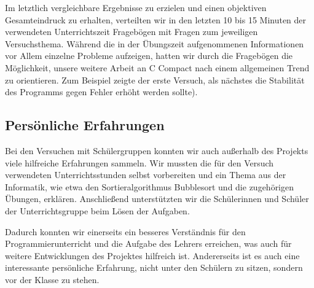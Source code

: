Im letztlich vergleichbare Ergebnisse zu erzielen und einen objektiven Gesamteindruck zu erhalten, verteilten wir in den letzten 10 bis 15 Minuten der verwendeten Unterrichtszeit Fragebögen mit Fragen zum jeweiligen Versuchsthema. Während die in der Übungszeit aufgenommenen Informationen vor Allem einzelne Probleme aufzeigen, hatten wir durch die Fragebögen die Möglichkeit, unsere weitere Arbeit an C Compact nach einem allgemeinen Trend zu orientieren. Zum Beispiel zeigte der erste Versuch, als nächstes die Stabilität des Programms gegen Fehler erhöht werden sollte).

\subsection{Persönliche Erfahrungen}
Bei den Versuchen mit Schülergruppen konnten wir auch außerhalb des Projekts viele hilfreiche Erfahrungen sammeln. Wir mussten die für den Versuch verwendeten Unterrichtsstunden selbst vorbereiten und ein Thema aus der Informatik, wie etwa den Sortieralgorithmus \glqq{}Bubblesort\grqq{} und die zugehörigen Übungen, erklären. Anschließend unterstützten wir die Schülerinnen und Schüler der Unterrichtsgruppe beim Lösen der Aufgaben.

Dadurch konnten wir einerseits ein besseres Verständnis für den Programmierunterricht und die Aufgabe des Lehrers erreichen, was auch für weitere Entwicklungen des Projektes hilfreich ist. Andererseits ist es auch eine interessante persönliche Erfahrung, nicht unter den Schülern zu sitzen, sondern vor der Klasse zu stehen.

